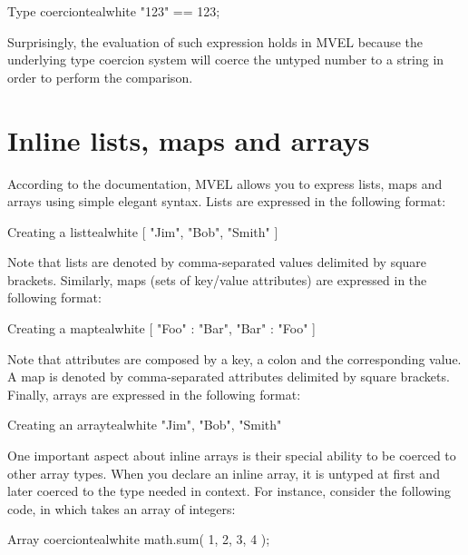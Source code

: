 \begin{codebox}{Type coercion}{teal}{\icnote}{white}
"123" == 123;
\end{codebox}

Surprisingly, the evaluation of such expression holds  in \gls{MVEL} because the underlying type coercion system will coerce the untyped number  to a string  in order to perform the comparison.

\section{Inline lists, maps and arrays}
\label{sec:mvelinlinelistsmapsandarrays}

According to the documentation, \gls{MVEL} allows you to express lists, maps and arrays using simple elegant syntax. Lists are expressed in the following format:

\begin{codebox}{Creating a list}{teal}{\icnote}{white}
[ "Jim", "Bob", "Smith" ]
\end{codebox}

Note that lists are denoted by comma-separated values delimited by square brackets. Similarly, maps (sets of key/value attributes) are expressed in the following format: 

\begin{codebox}{Creating a map}{teal}{\icnote}{white}
[ "Foo" : "Bar", "Bar" : "Foo" ]
\end{codebox}

Note that attributes are composed by a key, a colon and the corresponding value. A map is denoted by comma-separated attributes delimited  by square brackets. Finally, arrays are expressed in the following format:

\begin{codebox}{Creating an array}{teal}{\icnote}{white}
{ "Jim", "Bob", "Smith" }
\end{codebox}

One important aspect about inline arrays is their special ability to be coerced to other array types. When you declare an inline array, it is untyped at first and later coerced to the type needed in context. For instance, consider the following code, in which  takes an array of integers:

\begin{codebox}{Array coercion}{teal}{\icnote}{white}
math.sum({ 1, 2, 3, 4 });
\end{codebox}

